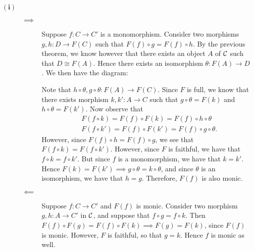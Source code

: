     \begin{prf}
        \begin{description}
            \item[$\bm{(i)}$] 
            \begin{description}
                \item[$\bm{\implies}$] Suppose $f: C \to C'$ is a
                monomorphism. Consider two morphisms $g,h: D \to F(C)$
                such that $F(f) \circ g = F(f) \circ h$. By the
                previous theorem, we know however that there exists an
                object $A$ of $\mathcal{C}$ such that $D \cong F(A)$. Hence
                there exists an isomorphism $\theta: F(A) \to D$. We
                then have the diagram:
                \begin{center}
                \end{center}
                Note that $h \circ \theta, g \circ \theta: F(A) \to
                F(C)$. Since $F$ is full, we know that there exists 
                morphism $k, k': A \to C$ such that $g \circ \theta =
                F(k)$ and $h \circ \theta = F(k')$. 
                Now observe that 
                \begin{align*}
                    &F(f \circ k) = F(f) \circ F(k) = F(f) \circ h \circ \theta\\
                    &F(f \circ k')= F(f) \circ F(k') = F(f) \circ g \circ \theta.
                \end{align*}
                However, since $F(f) \circ h = F(f) \circ g$, we see
                that $F(f \circ k) = F(f \circ k')$. However, since
                $F$ is faithful, we have that $f \circ k = f \circ
                k'$. But since $f$ is a monomorphism, we have that $k
                = k'$. Hence $F(k) = F(k') \implies g \circ \theta = k
                \circ \theta$, and since $\theta$ is an isomorphism,
                we have that $h = g$. Therefore, $F(f)$ is also monic.

                \item[$\bm{\impliedby}$] 
                Suppose $f: C \to C'$ and $F(f)$ is monic. Consider
                two morphism $g, h: A \to C'$ in $\mathcal{C}$, and suppose
                that $f \circ g = f \circ k$. Then $F(f) \circ F(g) =
                F(f) \circ F(k) \implies F(g) = F(k)$, since $F(f)$ is
                monic. However, $F$ is faithful, so that $g = k$. Hence $f$ is monic as well.
            \end{description}  


\end{description}
\end{prf}
